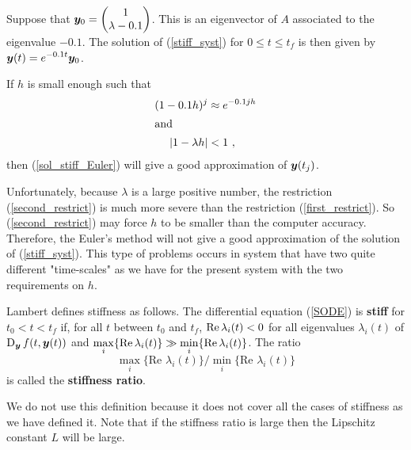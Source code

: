\begin{egg}
Suppose that
$\displaystyle \bm{y}_0 = \begin{pmatrix} 1 \\ \lambda-0.1
\end{pmatrix}$.  This is an eigenvector of $A$ associated to the
eigenvalue $-0.1$.   The solution of (\ref{stiff_syst}) for
$0\leq t \leq t_f$ is then given by
$\displaystyle \bm{y}(t) = e^{-0.1 t} \bm{y}_0$.

If $h$ is small enough such that
\begin{align}
(1-0.1h)^j &\approx e^{-0.1 jh} \label{first_restrict}\\
\intertext{and}
| 1 - \lambda h | &< 1  \ , \label{second_restrict}
\end{align}
then (\ref{sol_stiff_Euler}) will give a good approximation of
$\bm{y}(t_j)$.

Unfortunately, because $\lambda$ is a large positive number, the
restriction (\ref{second_restrict}) is much more severe than the
restriction (\ref{first_restrict}).  So (\ref{second_restrict}) may force
$h$ to be smaller than the computer accuracy.  Therefore, the Euler's method
will not give a good approximation of the solution of
(\ref{stiff_syst}).  This type of problems occurs in system that have
two quite different "time-scales" as we have for the present system with
the two requirements on $h$.
\end{egg}

\begin{rmk}
Lambert \cite{La} defines stiffness as follows.
The differential equation (\ref{SODE}) is
{\bfseries stiff}
for $t_0 < t < t_f$ if, for all $t$ between $t_0$ and $t_f$,
$\operatorname{Re} \lambda_i(t) < 0$ for all eigenvalues $\lambda_i(t)$
of $\displaystyle \operatorname{D}_{\bm{y}} f(t,\bm{y}(t))$ and
$\displaystyle \max_i \{ \operatorname{Re} \lambda_i(t) \} \gg
\min_i \{ \operatorname{Re} \lambda_i(t) \}$.  The ratio
\[
\max_i \{ \text{Re }\lambda_i(t) \}/\min_i \{\text{Re }\lambda_i(t)\}
\]
is called the {\bfseries stiffness ratio}.

We do not use this definition because it does not cover all the cases
of stiffness as we have defined it.  Note that if the stiffness ratio is
large then the Lipschitz constant $L$ will be large.
\end{rmk}

